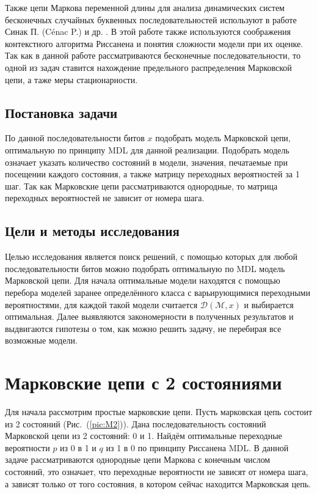 \documentclass[12pt]{article}
\begin{document}
	Также цепи Маркова переменной длины для анализа динамических систем бесконечных случайных буквенных последовательностей используют в работе Синак П. (Cénac P.) и др. \cite{cenac}. В этой работе также используются соображения контекстного алгоритма Риссанена и понятия сложности модели при их оценке. Так как в данной работе рассматриваются бесконечные последовательности, то одной из задач ставится нахождение предельного распределения Марковской цепи, а таже меры стационарности.
	
	\subsection*{Постановка задачи}
	 По данной последовательности битов $x$ подобрать модель Марковской цепи, оптимальную по принципу MDL для данной реализации. Подобрать модель означает указать количество состояний в модели, значения, печатаемые при посещении каждого состояния, а также матрицу переходных вероятностей за 1 шаг. Так как Марковские цепи рассматриваются однородные, то матрица переходных вероятностей не зависит от номера шага.
	
	\subsection*{Цели и методы исследования}
	Целью исследования является поиск решений, с помощью которых для любой последовательности битов можно подобрать оптимальную по MDL модель Марковской цепи. Для начала оптимальные модели находятся с помощью перебора моделей заранее определённого класса с варьирующимися переходными вероятностями, для каждой такой модели считается $\mathcal{D}(\mathcal{M},x)$ и выбирается оптимальная. Далее выявляются закономерности в полученных результатов и выдвигаются гипотезы о том, как можно решить задачу, не перебирая все возможные модели.
	
	\section{Марковские цепи с 2 состояниями}
	Для начала рассмотрим простые марковские цепи. Пусть марковская цепь состоит из 2 состояний (Рис.~(\ref{pic:M2})). Дана последовательность состояний Марковской цепи из 2 состояний: 0 и 1. Найдём оптимальные переходные вероятности $p$ из 0 в 1 и $q$ из 1 в 0 по принципу Риссанена MDL. В данной задаче рассматриваются однородные цепи Маркова с конечным числом состояний, это означает, что переходные вероятности не зависят от номера шага, а зависят только от того состояния, в котором сейчас находится Марковская цепь. 
	
\end{document}
